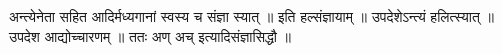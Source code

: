 अन्त्येनेता सहित आदिर्मध्यगानां स्वस्य च संज्ञा स्यात् ॥ इति
हल्संज्ञायाम् ॥ उपदेशेऽन्त्यं हलित्स्यात् ॥ उपदेश आद्योच्चारणम् ॥ ततः
अण् अच् इत्यादिसंज्ञासिद्धौ ॥
